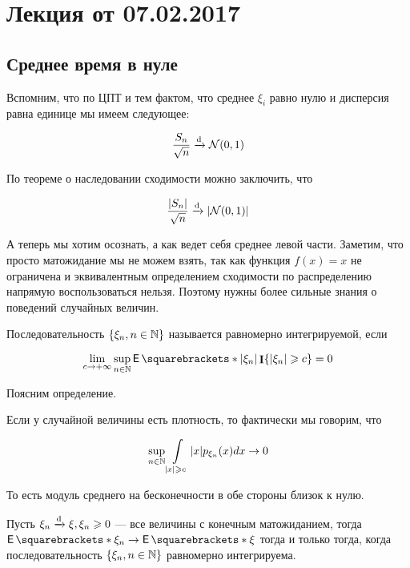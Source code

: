 \section{Лекция от 07.02.2017}

\subsection{Среднее время в нуле}

Вспомним, что по ЦПТ и тем фактом, что среднее $\xi_i$ равно нулю и дисперсия равна 
единице мы имеем следующее:

\[
  \frac{S_n}{\sqrt{n}} \xrightarrow{\mathrm{d}} \mathcal{N}(0, 1)
\]

По теореме о наследовании сходимости можно заключить, что

\[
  \frac{|S_n|}{\sqrt{n}} \xrightarrow{\mathrm{d}} |\mathcal{N}(0, 1)|
\]

А теперь мы хотим осознать, а как ведет себя среднее левой части. Заметим, что
просто матожидание мы не можем взять, так как функция $f(x) = x$ не ограничена
и эквивалентным определением сходимости по распределению напрямую воспользоваться
нельзя. Поэтому нужны более сильные знания о поведений случайных величин.

\begin{definition}
  Последовательность $\{\xi_n, n \in \mathbb{N}\}$ называется равномерно интегрируемой,
  если

  \[
    \lim\limits_{c \to +\infty} \sup\limits_{n \in \N} \E{|\xi_n|\I\{|\xi_n| \geq c\}} = 0
  \]
\end{definition}

Поясним определение.

Если у случайной величины есть плотность, то фактически мы говорим, что

\[
  \sup\limits_{n \in \mathbb{N}} \int\limits_{|x| \geqslant c} |x| p_{\xi_n}(x) dx \to 0
\]

То есть модуль среднего на бесконечности в обе стороны близок к нулю.

\begin{theorem}
  Пусть $\xi_n \xrightarrow{\mathrm{d}} \xi, \xi_n \geqslant 0$ --- все величины с конечным матожиданием,
  тогда $\E{\xi_n} \to \E{\xi}$ тогда
  и только тогда, когда последовательность $\{\xi_n, n \in \mathbb{N}\}$ равномерно 
  интегрируема.
\end{theorem}


